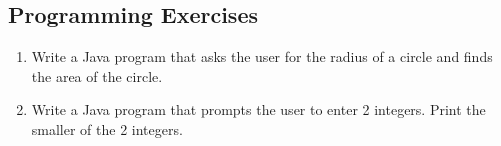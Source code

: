 \subsection{Programming Exercises}

\setcounter{counter}{1}
\begin{enumerate}[label={\arabic{counter}\addtocounter{counter}{1}}.]

\item Write a Java program that asks the user for the radius of a circle and finds the area of the circle.

\item Write a Java program that prompts the user to enter 2 integers. Print the smaller of the 2 integers.

\end{enumerate}